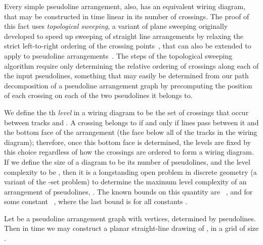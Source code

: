 \documentclass[oribibl]{llncs}
\begin{document}
Every simple pseudoline arrangement, also, has an equivalent wiring diagram, that may be constructed in time linear in its number of crossings. The proof of this fact uses \emph{topological sweeping}, a variant of  plane sweeping originally developed to speed up sweeping of straight line arrangements by relaxing the strict left-to-right ordering of the crossing points~\cite{EdeGui-JCSS-89}, that can also be extended to apply to pseudoline arrangements~\cite{SnoHer-SCG-89}. The steps of the topological sweeping algorithm require only determining the relative ordering of crossings along each of the input pseudolines, something that may easily be determined from our path decomposition of a pseudoline arrangement graph by precomputing the position of each crossing on each of the two pseudolines it belongs to.

We define the th \emph{level}  in a wiring diagram  to be the set of crossings that occur between tracks  and . A crossing belongs to  if and only if  lines pass between it and the bottom face of the arrangement (the face below all of the tracks in the wiring diagram); therefore, once this bottom face is determined, the levels are fixed by this choice regardless of how the crossings are ordered to form a wiring diagram. If we define the size  of a diagram to be its number of pseudolines, and the level complexity  to be , then it is a longstanding open problem in discrete geometry (a variant of the -set problem) to determine the maximum level complexity of an arrangement of  pseudolines,
.
The known bounds on this quantity are
~\cite{Dey-DCG-98,TamTok-Algo-03,ShaSmo-WADS-03},
and
 for some constant ~\cite{KlaPatPip-82,Tot-DCG-01},
where the last bound is  for all constants .

\begin{theorem}
\label{thm:draw}
Let  be a pseudoline arrangement graph with  vertices, determined by  pseudolines. Then in time  we may construct a planar straight-line drawing of , in a grid of size .
\end{theorem}
\end{document}
